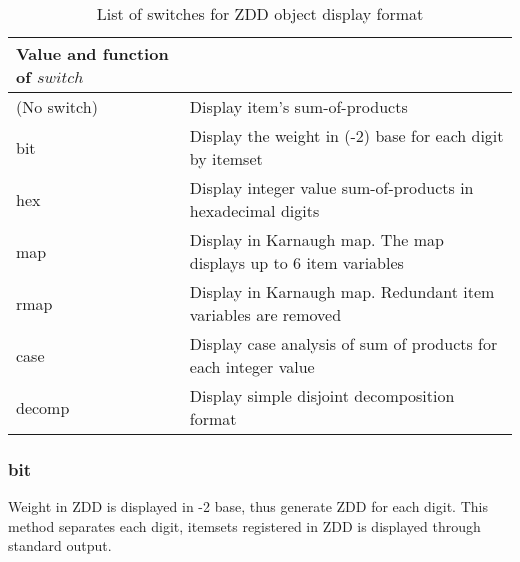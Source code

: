 \begin{table}[htbp]
\begin{center}
\caption{List of switches for ZDD object display format\label{tbl:zdd_show_switch}}
{\small
\begin{tabular}{l|l}
\hline
Value and function of $switch$ \\
\hline
 (No switch)	& Display item's sum-of-products \\
  bit					& Display the weight in (-2) base for each digit by itemset \\
  hex					& Display integer value sum-of-products in hexadecimal digits\\
  map				& Display in Karnaugh map. The map displays up to 6 item variables\\
  rmap				& Display in Karnaugh map. Redundant item variables are removed \\
  case				& Display case analysis of sum of products for each integer value \\
  decomp			& Display simple disjoint decomposition format \\
\hline
\end{tabular}
}
\end{center}
\end{table}

\subsubsection*{bit}
Weight in ZDD is displayed in -2 base, thus generate ZDD for each digit. 
This method separates each digit, itemsets registered in ZDD is displayed through standard output. 
